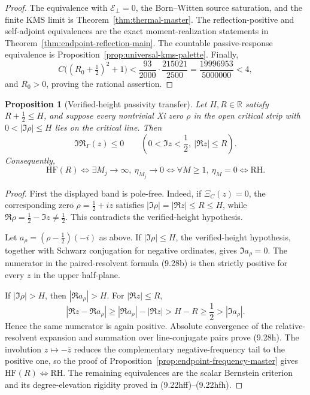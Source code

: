 \documentclass[11pt]{article}
\newtheorem{proposition}[theorem]{Proposition}
\begin{document}
\begin{proof}
The equivalence with $\mathcal E_\perp=0$, the Born--Witten source saturation, and the finite KMS
limit is Theorem~\ref{thm:thermal-master}.  The reflection-positive and self-adjoint equivalences
are the exact moment-realization statements in Theorem~\ref{thm:endpoint-reflection-main}.
The countable passive-response equivalence is
Proposition~\ref{prop:universal-kms-palette}.
Finally,
\[
 C\bigl((R_0+\tfrac12)^2+1\bigr)
 <\frac{93}{2000}\cdot\frac{215021}{2500}
 =\frac{19996953}{5000000}<4,
\]
and $R_0>0$, proving the rational assertion.
\end{proof}

\begin{proposition}[Verified-height passivity transfer]
\label{prop:verified-height-frequency-transfer}
Let $H,R\in\mathbb R$ satisfy $R+\frac12\le H$, and suppose every nontrivial Xi zero
$\rho$ in the open critical strip with $0<|\Im\rho|\le H$ lies on the critical line.  Then
\[
 \Im\mathfrak R_\Gamma(z)\le0
 \qquad\left(0<\Im z<\frac12,\ |\Re z|\le R\right).
 \tag{9.28h}
\]
Consequently,
\[
 \mathrm{HF}(R)
 \Longleftrightarrow
 \exists M_j\to\infty,\ \eta_{M_j}\to0
 \Longleftrightarrow
 \forall M\ge1,\ \eta_M=0
 \Longleftrightarrow\mathrm{RH}.
 \tag{9.28i}
\]
\end{proposition}

\begin{proof}
First the displayed band is pole-free.  Indeed, if $\Xi_C(z)=0$, the corresponding zero
$\rho=\frac12+iz$ satisfies
$|\Im\rho|=|\Re z|\le R\le H$, while
$\Re\rho=\frac12-\Im z\ne\frac12$.  This contradicts the verified-height hypothesis.

Let $a_\rho=(\rho-\frac12)(-i)$ as above.  If $|\Im\rho|\le H$, the verified-height
hypothesis, together with Schwarz conjugation for negative ordinates, gives
$\Im a_\rho=0$.  The numerator in the paired-resolvent formula \textup{(9.28b)} is then
strictly positive for every $z$ in the upper half-plane.

If $|\Im\rho|>H$, then $|\Re a_\rho|>H$.  For $|\Re z|\le R$,
\[
 |\Re z-\Re a_\rho|
 \ge |\Re a_\rho|-|\Re z|
 >H-R\ge\frac12>|\Im a_\rho|.
 \tag{9.28j}
\]
Hence the same numerator is again positive.  Absolute convergence of the relative-resolvent
expansion and summation over line-conjugate pairs prove \textup{(9.28h)}.  The involution
$z\mapsto-\overline z$ reduces the complementary negative-frequency tail to the positive one,
so the proof of Proposition~\ref{prop:endpoint-frequency-master} gives
$\mathrm{HF}(R)\Longleftrightarrow\mathrm{RH}$.  The remaining equivalences are the scalar
Bernstein criterion and its degree-elevation rigidity proved in
\textup{(9.22hff)}--\textup{(9.22hfh)}.
\end{proof}
\end{document}
